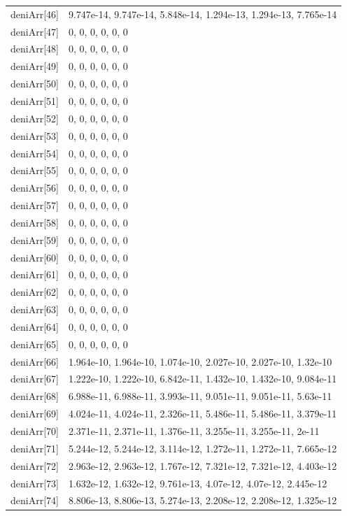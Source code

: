 {\begin{longtable}{p{}p{}}
{}deniArr[46] & 9.747e-14, 9.747e-14, 5.848e-14, 1.294e-13, 1.294e-13, 7.765e-14\\
{}deniArr[47] & 0, 0, 0, 0, 0, 0\\
{}deniArr[48] & 0, 0, 0, 0, 0, 0\\
{}deniArr[49] & 0, 0, 0, 0, 0, 0\\
{}deniArr[50] & 0, 0, 0, 0, 0, 0\\
{}deniArr[51] & 0, 0, 0, 0, 0, 0\\
{}deniArr[52] & 0, 0, 0, 0, 0, 0\\
{}deniArr[53] & 0, 0, 0, 0, 0, 0\\
{}deniArr[54] & 0, 0, 0, 0, 0, 0\\
{}deniArr[55] & 0, 0, 0, 0, 0, 0\\
{}deniArr[56] & 0, 0, 0, 0, 0, 0\\
{}deniArr[57] & 0, 0, 0, 0, 0, 0\\
{}deniArr[58] & 0, 0, 0, 0, 0, 0\\
{}deniArr[59] & 0, 0, 0, 0, 0, 0\\
{}deniArr[60] & 0, 0, 0, 0, 0, 0\\
{}deniArr[61] & 0, 0, 0, 0, 0, 0\\
{}deniArr[62] & 0, 0, 0, 0, 0, 0\\
{}deniArr[63] & 0, 0, 0, 0, 0, 0\\
{}deniArr[64] & 0, 0, 0, 0, 0, 0\\
{}deniArr[65] & 0, 0, 0, 0, 0, 0\\
{}deniArr[66] & 1.964e-10, 1.964e-10, 1.074e-10, 2.027e-10, 2.027e-10, 1.32e-10\\
{}deniArr[67] & 1.222e-10, 1.222e-10, 6.842e-11, 1.432e-10, 1.432e-10, 9.084e-11\\
{}deniArr[68] & 6.988e-11, 6.988e-11, 3.993e-11, 9.051e-11, 9.051e-11, 5.63e-11\\
{}deniArr[69] & 4.024e-11, 4.024e-11, 2.326e-11, 5.486e-11, 5.486e-11, 3.379e-11\\
{}deniArr[70] & 2.371e-11, 2.371e-11, 1.376e-11, 3.255e-11, 3.255e-11, 2e-11\\
{}deniArr[71] & 5.244e-12, 5.244e-12, 3.114e-12, 1.272e-11, 1.272e-11, 7.665e-12\\
{}deniArr[72] & 2.963e-12, 2.963e-12, 1.767e-12, 7.321e-12, 7.321e-12, 4.403e-12\\
{}deniArr[73] & 1.632e-12, 1.632e-12, 9.761e-13, 4.07e-12, 4.07e-12, 2.445e-12\\
{}deniArr[74] & 8.806e-13, 8.806e-13, 5.274e-13, 2.208e-12, 2.208e-12, 1.325e-12\\

\end{longtable}}
